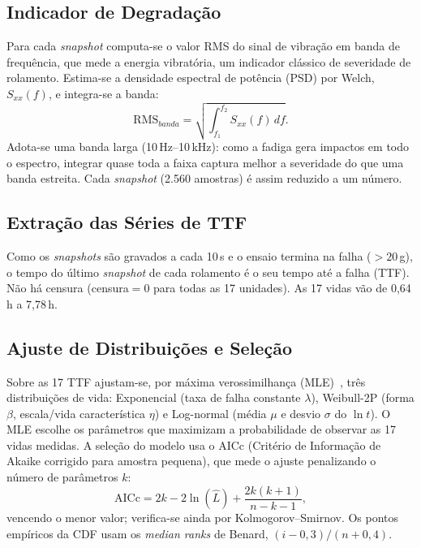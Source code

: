 \documentclass[conference]{IEEEtran}
\begin{document}
\subsection{Indicador de Degradação}
Para cada \textit{snapshot} computa-se o valor RMS do sinal de vibração em banda de
frequência, que mede a energia vibratória, um indicador clássico de
severidade de rolamento. Estima-se a densidade espectral de potência (PSD) por Welch,
$S_{xx}(f)$, e integra-se a banda:
\begin{equation}
\mathrm{RMS}_{banda} = \sqrt{\textstyle\int_{f_1}^{f_2} S_{xx}(f)\,df}.
\end{equation}
Adota-se uma banda larga (10\,Hz--10\,kHz): como a fadiga gera impactos em
todo o espectro, integrar quase toda a faixa captura melhor a severidade do que uma
banda estreita. Cada \textit{snapshot} (2.560 amostras) é assim reduzido a um número.

\subsection{Extração das Séries de TTF}
Como os \textit{snapshots} são gravados a cada 10\,s e o ensaio termina na falha
($>20$\,g), o tempo do último \textit{snapshot} de cada rolamento é o seu
tempo até a falha (TTF). Não há censura (censura$=0$ para todas as 17
unidades). As 17 vidas vão de 0,64\,h a 7,78\,h.

\subsection{Ajuste de Distribuições e Seleção}
Sobre as 17 TTF ajustam-se, por máxima verossimilhança (MLE)~\cite{colosimo2006},
três distribuições de vida: Exponencial (taxa de falha constante $\lambda$),
Weibull-2P (forma $\beta$, escala/vida característica $\eta$) e
Log-normal (média $\mu$ e desvio $\sigma$ do $\ln t$). O MLE escolhe os
parâmetros que maximizam a probabilidade de observar as 17 vidas medidas. A seleção do
modelo usa o AICc (Critério de Informação de Akaike corrigido para amostra
pequena), que mede o ajuste penalizando o número de parâmetros $k$:
\begin{equation}
\mathrm{AICc} = 2k - 2\ln(\hat{L}) + \frac{2k(k+1)}{n-k-1},
\end{equation}
vencendo o menor valor; verifica-se ainda por Kolmogorov--Smirnov. Os pontos
empíricos da CDF usam os \textit{median ranks} de Benard, $(i-0{,}3)/(n+0{,}4)$.
\end{document}
